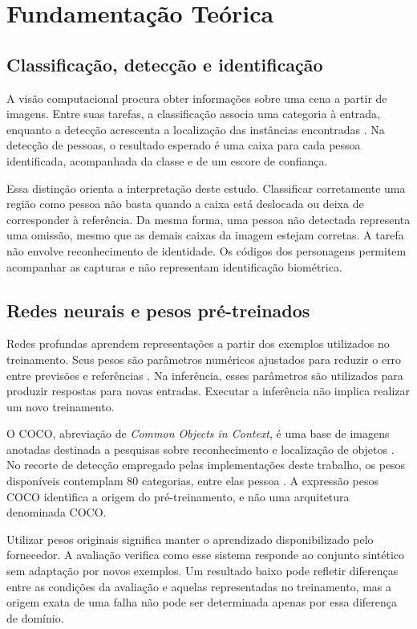 \chapter{Fundamentação Teórica}
\section{Classificação, detecção e identificação}
A visão computacional procura obter informações sobre uma cena a partir de imagens. Entre suas tarefas, a classificação associa uma categoria à entrada, enquanto a detecção acrescenta a localização das instâncias encontradas \cite{szeliski2010}. Na detecção de pessoas, o resultado esperado é uma caixa para cada pessoa identificada, acompanhada da classe e de um escore de confiança.

Essa distinção orienta a interpretação deste estudo. Classificar corretamente uma região como pessoa não basta quando a caixa está deslocada ou deixa de corresponder à referência. Da mesma forma, uma pessoa não detectada representa uma omissão, mesmo que as demais caixas da imagem estejam corretas. A tarefa não envolve reconhecimento de identidade. Os códigos dos personagens permitem acompanhar as capturas e não representam identificação biométrica.

\section{Redes neurais e pesos pré-treinados}
Redes profundas aprendem representações a partir dos exemplos utilizados no treinamento. Seus pesos são parâmetros numéricos ajustados para reduzir o erro entre previsões e referências \cite{lecun2015,goodfellow2016}. Na inferência, esses parâmetros são utilizados para produzir respostas para novas entradas. Executar a inferência não implica realizar um novo treinamento.

O COCO, abreviação de \textit{Common Objects in Context}, é uma base de imagens anotadas destinada a pesquisas sobre reconhecimento e localização de objetos \cite{lin2014microsoft}. No recorte de detecção empregado pelas implementações deste trabalho, os pesos disponíveis contemplam 80 categorias, entre elas pessoa \cite{ultralytics_yolo11_docs}. A expressão pesos COCO identifica a origem do pré-treinamento, e não uma arquitetura denominada COCO.

Utilizar pesos originais significa manter o aprendizado disponibilizado pelo fornecedor. A avaliação verifica como esse sistema responde ao conjunto sintético sem adaptação por novos exemplos. Um resultado baixo pode refletir diferenças entre as condições da avaliação e aquelas representadas no treinamento, mas a origem exata de uma falha não pode ser determinada apenas por essa diferença de domínio.

